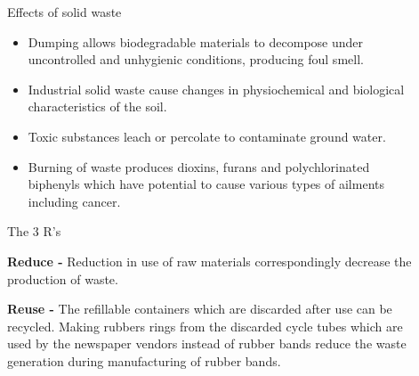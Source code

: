 \documentclass[final]{beamer}
\newlength{\sepwid}
\newlength{\onecolwid}
\newlength{\twocolwid}
\begin{document}
\begin{frame}
\begin{columns}[t]
\begin{column}{\onecolwid}

\end{column} %

\begin{column}{\sepwid}\end{column} %

\begin{column}{\twocolwid} %

\begin{columns}[t,totalwidth=\twocolwid] %

\begin{column}{\onecolwid}\vspace{-.74in} %


\begin{exampleblock}{Effects of solid waste}
\begin{itemize}
    \item Dumping allows biodegradable materials to decompose under uncontrolled and unhygienic conditions, producing foul smell.
    \item Industrial solid waste cause changes in physiochemical and biological characteristics of the soil.
    \item Toxic substances leach or percolate to contaminate ground water.
    \item Burning of waste produces dioxins, furans and polychlorinated biphenyls which have potential to cause various types of ailments including cancer.
\end{itemize}

\end{exampleblock}
\begin{exampleblock}{The 3 R's}

\textbf{Reduce - } Reduction in use of raw materials correspondingly decrease the production of waste.

\textbf{Reuse - } The refillable containers which are discarded after use can be recycled. Making rubbers rings from the discarded cycle tubes which are used by the newspaper vendors instead of rubber bands reduce the waste generation during manufacturing of rubber bands. 


\end{exampleblock}
\end{column}
\end{columns}
\end{column}
\end{columns}
\end{frame}
\end{document}
